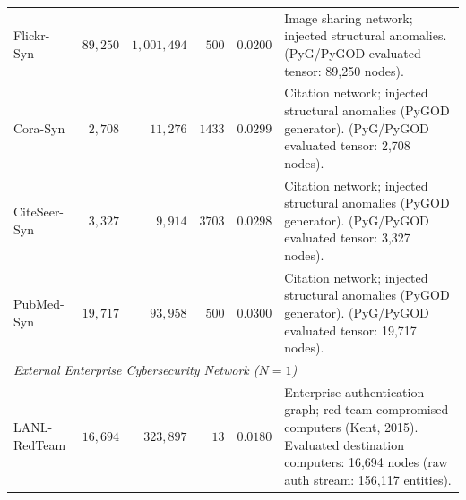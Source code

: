 \begin{table}[htbp]
\begin{tabularx}{\textwidth}{lrrrrX}
Flickr-Syn & $89,250$ & $1,001,494$ & $500$ & $0.0200$ & Image sharing network; injected structural anomalies. (PyG/PyGOD evaluated tensor: 89,250 nodes). \\
Cora-Syn & $2,708$ & $11,276$ & $1433$ & $0.0299$ & Citation network; injected structural anomalies (PyGOD generator). (PyG/PyGOD evaluated tensor: 2,708 nodes). \\
CiteSeer-Syn & $3,327$ & $9,914$ & $3703$ & $0.0298$ & Citation network; injected structural anomalies (PyGOD generator). (PyG/PyGOD evaluated tensor: 3,327 nodes). \\
PubMed-Syn & $19,717$ & $93,958$ & $500$ & $0.0300$ & Citation network; injected structural anomalies (PyGOD generator). (PyG/PyGOD evaluated tensor: 19,717 nodes). \\
\midrule
\multicolumn{6}{l}{\textit{External Enterprise Cybersecurity Network ($N=1$)}} \\
LANL-RedTeam & $16,694$ & $323,897$ & $13$ & $0.0180$ & Enterprise authentication graph; red-team compromised computers (Kent, 2015). Evaluated destination computers: 16,694 nodes (raw auth stream: 156,117 entities). \\
\bottomrule
\end{tabularx}
\end{table}
